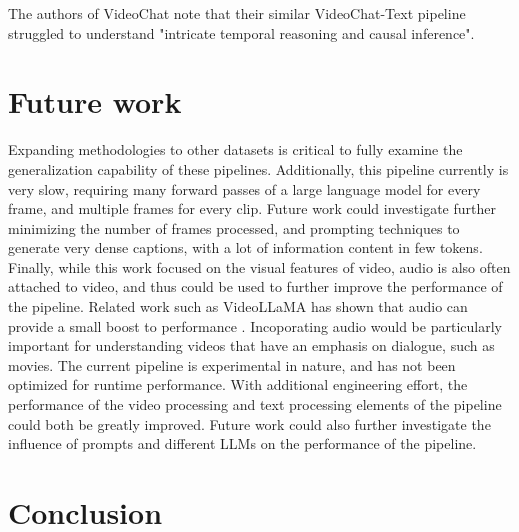 \documentclass{article}
\begin{document}
The authors of VideoChat note that their similar VideoChat-Text pipeline struggled to understand "intricate temporal reasoning and causal inference".

\section{Future work}

Expanding methodologies to other datasets is critical to fully examine the generalization capability of these pipelines.
Additionally, this pipeline currently is very slow, requiring many forward passes of a large language model for every frame, and multiple frames for every clip.
Future work could investigate further minimizing the number of frames processed, and prompting techniques to generate very dense captions, with a lot of information content in few tokens.
Finally, while this work focused on the visual features of video, audio is also often attached to video, and thus could be used to further improve the performance of the pipeline.
Related work such as VideoLLaMA has shown that audio can provide a small boost to performance \cite{videollama}.
Incoporating audio would be particularly important for understanding videos that have an emphasis on dialogue, such as movies.
The current pipeline is experimental in nature, and has not been optimized for runtime performance.
With additional engineering effort, the performance of the video processing and text processing elements of the pipeline could both be greatly improved.
Future work could also further investigate the influence of prompts and different LLMs on the performance of the pipeline.

\section{Conclusion}



\end{document}
